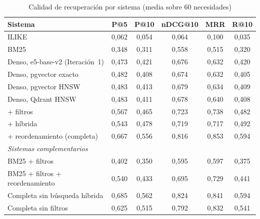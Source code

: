 \begin{table}[htbp!]
    \centering
    \caption{Calidad de recuperación por sistema (media sobre 60 necesidades)}
    \label{tab:res-pe1-global}
    \begin{tabular}{|l|c|c|c|c|c|}
        \hline
        \textbf{Sistema} & \textbf{P@5} & \textbf{P@10} & \textbf{nDCG@10} & \textbf{MRR} & \textbf{R@10} \\
        \hline
        ILIKE & 0{,}062 & 0{,}054 & 0{,}064 & 0{,}100 & 0{,}035 \\
        \hline
        BM25 & 0{,}348 & 0{,}311 & 0{,}558 & 0{,}515 & 0{,}320 \\
        \hline
        Denso, e5-base-v2 (Iteración~1) & 0{,}473 & 0{,}421 & 0{,}676 & 0{,}632 & 0{,}420 \\
        \hline
        Denso, pgvector exacto & 0{,}482 & 0{,}408 & 0{,}674 & 0{,}632 & 0{,}405 \\
        \hline
        Denso, pgvector HNSW & 0{,}483 & 0{,}413 & 0{,}679 & 0{,}634 & 0{,}409 \\
        \hline
        Denso, Qdrant HNSW & 0{,}483 & 0{,}411 & 0{,}678 & 0{,}640 & 0{,}408 \\
        \hline
        + filtros & 0{,}567 & 0{,}465 & 0{,}723 & 0{,}738 & 0{,}482 \\
        \hline
        + híbrida & 0{,}543 & 0{,}478 & 0{,}719 & 0{,}717 & 0{,}492 \\
        \hline
        + reordenamiento (completa) & 0{,}667 & 0{,}556 & 0{,}816 & 0{,}853 & 0{,}594 \\
        \hline
        \multicolumn{6}{|l|}{\textit{Sistemas complementarios}} \\
        \hline
        BM25 + filtros & 0{,}402 & 0{,}350 & 0{,}595 & 0{,}597 & 0{,}375 \\
        \hline
        BM25 + filtros + reordenamiento & 0{,}540 & 0{,}433 & 0{,}695 & 0{,}729 & 0{,}441 \\
        \hline
        Completa sin búsqueda híbrida & 0{,}685 & 0{,}562 & 0{,}824 & 0{,}841 & 0{,}594 \\
        \hline
        Completa sin filtros & 0{,}625 & 0{,}515 & 0{,}792 & 0{,}832 & 0{,}541 \\
        \hline
    \end{tabular}
\end{table}
